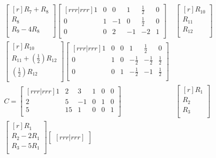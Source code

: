 \documentclass[12pt]{article}
\begin{document}
\begin{enumerate}
\begin{align*}
	\begin{bmatrix}[r]
	R_7 + R_8\\
	R_8\\
	R_9 - 4R_8\\
	\end{bmatrix}
	\begin{bmatrix}[rrr|rrr]
	1 & 0 & 0 & 1 & \frac{1}{2} & 0\\
	0 & 1 & -1 & 0 & \frac{1}{2} & 0\\
	0 & 0 & 2 & -1 & -2 & 1\\
	\end{bmatrix}&
	\begin{bmatrix}[r] R_{10}\\ R_{11}\\ R_{12}\\ \end{bmatrix}\\
	\begin{bmatrix}[r]
	R_{10}\\
	R_{11} + (\frac{1}{2})R_{12}\\
	(\frac{1}{2})R_12\\
	\end{bmatrix}
	\begin{bmatrix}[rrr|rrr]
	1 & 0 & 0 & 1 & \frac{1}{2} & 0\\
	0 & 1 & 0 & -\frac{1}{2} & -\frac{1}{2} & \frac{1}{2}\\
	0 & 0 & 1 & -\frac{1}{2} & -1 & \frac{1}{2}\\
	\end{bmatrix}&\\
	C=
	\begin{bmatrix}[rrr|rrr]
	1 & 2 & 3 & 1 & 0 & 0\\
	2 & 5 & -1 & 0 & 1 & 0\\
	5 & 15 & 1 & 0 & 0 & 1\\
	\end{bmatrix}&
	\begin{bmatrix}[r] R_1\\ R_2\\ R_3\\ \end{bmatrix}\\
	\begin{bmatrix}[r]
	R_1\\
	R_2 - 2R_1\\
	R_3 - 5R_1\\
	\end{bmatrix}
	\begin{bmatrix}[rrr|rrr]

\end{bmatrix}
\end{align*}
\end{enumerate}
\end{document}

